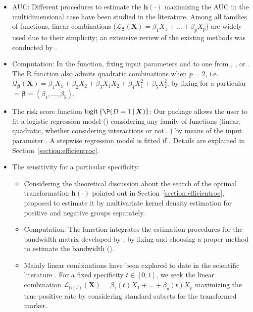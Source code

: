 \begin{itemize}
\item[1.-] AUC: Different procedures to estimate the $\boldsymbol{h}(\cdot)$ maximizing the AUC in the multidimensional case have been studied in the literature. Among all families of functions, linear combinations ($\mathcal{L}_{\boldsymbol{\beta}}(\boldsymbol{X}) = \beta_1 X_1 + \dots + \beta_p X_p$) are widely used due to their simplicity; an extensive review of the existing methods was conducted by \citet{Kang2016}.
\item[] Computation: In the  function, fixing input parameters  and  to one from  \citep{Su1993},  \citep{Pepe2000}, or  \citep{Liu2011}. The R function also admits quadratic combinations when $p=2$, i.e. $\mathcal{Q}_{\boldsymbol{\beta}}(\boldsymbol{X}) = \beta_1 X_1 + \beta_2 X_2 + \beta_3 X_1 X_2 + \beta_4 X_1^2 + \beta_5 X_2^2$, by fixing  for a particular  $= \boldsymbol{\beta} = (\beta_1, \dots, \beta_5)$.
\item[2.-] The risk score function $\mbox{logit} \left\{ \P(D = 1 \, | \, \boldsymbol{X}) \right\}$: Our package allows the user to fit a logistic regression model () considering any family of functions (linear, quadratic, whether considering interactions or not...) by means of the input parameter . A stepwise regression model is fitted if . Details are explained in Section~\ref{section:efficientroc}.
\item[3.-] The sensitivity for a particular specificity:
\begin{itemize}
\item[a)] Considering the theoretical discussion about the search of the optimal transformation $\boldsymbol{h}(\cdot)$ pointed out in Section~\ref{section:efficientroc}, \citet{Camblor2021b} proposed to estimate it by multivariate kernel density estimation for positive and negative groups separately.
\item[] Computation: The  function integrates the estimation procedures for the bandwidth matrix developed by \citet{Duong2007}, by fixing  and choosing a proper method to estimate the bandwidth ().
\item[b)] Mainly linear combinations have been explored to date in the scientific literature \citep{Meisner2021,PerezFernandez2020}. For a fixed specificity $t\in[0,1]$, we seek the linear combination $\mathcal{L}_{\boldsymbol{\beta}(t)}(\boldsymbol{X}) = \beta_1(t) X_1 + \dots + \beta_p(t) X_p$ maximizing the true-positive rate by considering standard subsets for the transformed marker.

\end{itemize}
\end{itemize}
